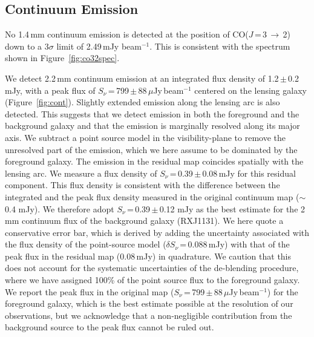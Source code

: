 \documentclass[]{emulateapj}
\newcommand{\rarr}{$\rightarrow$}
\newcommand{\cco}{\mbox{CO($J$\,=\,3\,\rarr\,2)}\xspace}
\newcommand{\pmOne}{\mbox{$^{-1}$}\xspace}
\newcommand{\eq}{\,=\,}
\newcommand{\pmm}{\,$\pm$\,}
\newcommand{\Fig}[1]{Figure~\ref{fig:#1}}
\begin{document}
\subsection{Continuum Emission} \label{sec:deblend}
No 1.4\,mm continuum emission is detected at the position of \cco
down to a 3$\sigma$ limit of 2.49\,mJy beam\pmOne.
This is consistent with the spectrum shown in \Fig{co32spec}.

We detect 2.2\,mm continuum emission at an
integrated flux density of
1.2\pmm0.2 mJy, with a peak flux of
$S_{\nu}$\,=\,799\pmm88\,$\mu$Jy\,beam\pmOne
centered on the lensing galaxy (\Fig{cont}).
Slightly extended emission
along the lensing arc is also detected.
This suggests that we detect emission in both
the foreground and the background galaxy and that the
emission is marginally resolved along its major axis.
We subtract a point source model in the visibility-plane to remove the unresolved part of the
emission, which we here assume to be dominated by the foreground galaxy. The emission
in the residual map coincides spatially with the lensing arc. We measure a flux density
of $S_{\nu}$\eq0.39\,$\pm$\,0.08\,mJy for this residual component.
This flux density is consistent with
the difference between the integrated and the peak flux density measured in the
original continuum map ($\sim$0.4 mJy).
We therefore adopt $S_{\nu}$\eq0.39\pmm0.12 mJy as the best estimate for the 2\,mm continuum flux of
the background galaxy (RXJ1131).
We here quote a conservative error bar, which is derived by adding the uncertainty
associated with the flux density of the
point-source model ($\delta S_{\nu}$\eq0.088\,mJy) with
that of the peak flux in the residual map (0.08\,mJy)
in quadrature. We caution that this does not account for the systematic uncertainties of the
de-blending procedure, where we have assigned 100\% of the point source flux to the foreground galaxy.
We report the peak flux in the original map
($S_{\nu}$\,=\,799\pmm88\,$\mu$Jy\,beam\pmOne) for the foreground galaxy, which
is the best estimate possible at the resolution of our observations, but we acknowledge that a non-negligible contribution from the background source to the peak flux cannot be ruled out.
\end{document}
